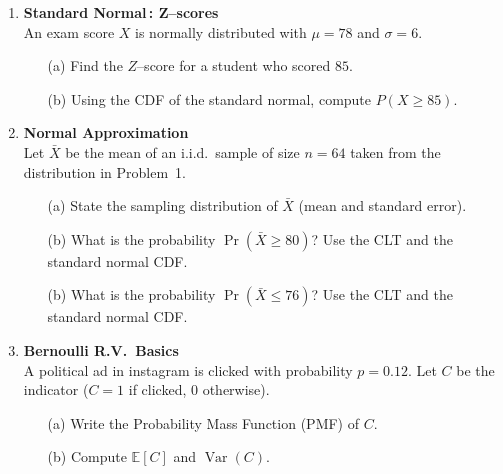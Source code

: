 \documentclass{article}
\begin{document}
\begin{enumerate}
    \item \textbf{Standard Normal\,:  Z–scores}  \\
          An exam score $X$ is normally distributed with $\mu = 78$ and $\sigma = 6$.
          \begin{enumerate}
              \item[(a)] Find the $Z$–score for a student who scored $85$.
              \item[(b)] Using the CDF of the standard normal, compute $P(X \ge 85)$.
          \end{enumerate}

    \item \textbf{Normal Approximation}  \\
          Let $\bar{X}$ be the mean of an i.i.d.\ sample of size $n=64$ taken from the distribution in Problem~1.
          \begin{enumerate}
              \item[(a)] State the sampling distribution of $\bar{X}$ (mean and standard error).
              \item[(b)] What is the probability $\Pr(\bar{X}\geq 80)$? Use the CLT and the standard normal CDF.
              \item[(b)] What is the probability $\Pr(\bar{X}\leq 76)$? Use the CLT and the standard normal CDF.
          \end{enumerate}

    \item \textbf{Bernoulli R.V.\ Basics}  \\
          A political ad in instagram is clicked with probability $p=0.12$.  Let $C$ be the indicator ($C=1$ if clicked, $0$ otherwise).
          \begin{enumerate}
              \item[(a)] Write the Probability Mass Function (PMF) of $C$.
              \item[(b)] Compute $\mathbb{E}[C]$ and $\operatorname{Var}(C)$.
          \end{enumerate}


\end{enumerate}
\end{document}
